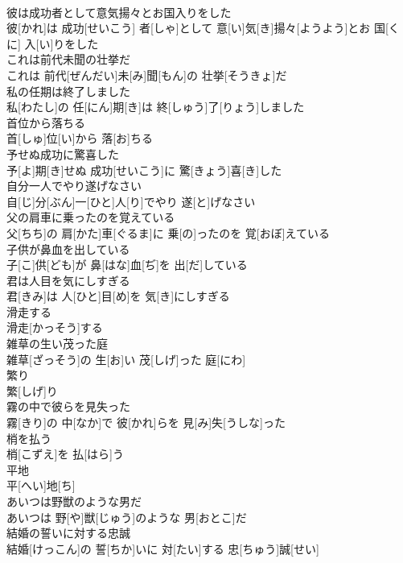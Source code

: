 \documentclass[8pt]{extreport}
\begin{document}
\begin{CJK}{UTF8}{min}
\\	彼は成功者として意気揚々とお国入りをした	
\\	彼[かれ]は 成功[せいこう] 者[しゃ]として 意[い]気[き]揚々[ようよう]とお 国[くに] 入[い]りをした
\\	これは前代未聞の壮挙だ	
\\	これは 前代[ぜんだい]未[み]聞[もん]の 壮挙[そうきょ]だ
\\	私の任期は終了しました	
\\	私[わたし]の 任[にん]期[き]は 終[しゅう]了[りょう]しました
\\	首位から落ちる	
\\	首[しゅ]位[い]から 落[お]ちる
\\	予せぬ成功に驚喜した	
\\	予[よ]期[き]せぬ 成功[せいこう]に 驚[きょう]喜[き]した
\\	自分一人でやり遂げなさい	
\\	自[じ]分[ぶん]一[ひと]人[り]でやり 遂[と]げなさい
\\	父の肩車に乗ったのを覚えている	
\\	父[ちち]の 肩[かた]車[ぐるま]に 乗[の]ったのを 覚[おぼ]えている
\\	子供が鼻血を出している	
\\	子[こ]供[ども]が 鼻[はな]血[ぢ]を 出[だ]している
\\	君は人目を気にしすぎる	
\\	君[きみ]は 人[ひと]目[め]を 気[き]にしすぎる
\\	滑走する	
\\	滑走[かっそう]する
\\	雑草の生い茂った庭	
\\	雑草[ざっそう]の 生[お]い 茂[しげ]った 庭[にわ]
\\	繁り	
\\	繁[しげ]り
\\	霧の中で彼らを見失った	
\\	霧[きり]の 中[なか]で 彼[かれ]らを 見[み]失[うしな]った
\\	梢を払う	
\\	梢[こずえ]を 払[はら]う
\\	平地	
\\	平[へい]地[ち]
\\	あいつは野獣のような男だ	
\\	あいつは 野[や]獣[じゅう]のような 男[おとこ]だ
\\	結婚の誓いに対する忠誠	
\\	結婚[けっこん]の 誓[ちか]いに 対[たい]する 忠[ちゅう]誠[せい]

\end{CJK}
\end{document}
